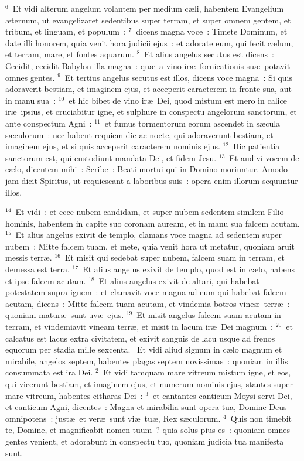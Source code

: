 ${}^{6}$~Et vidi alterum angelum volantem per medium c\ae li, habentem Evangelium \ae ternum, ut evangelizaret sedentibus super terram, et super omnem gentem, et tribum, et linguam, et populum~:
${}^{7}$~dicens magna voce~: Timete Dominum, et date illi honorem, quia venit hora judicii ejus~: et adorate eum, qui fecit c\ae lum, et terram, mare, et fontes aquarum.
${}^{8}$~Et alius angelus secutus est dicens~: Cecidit, cecidit Babylon illa magna~: qu\ae\ a vino ir\ae\ fornicationis su\ae\ potavit omnes gentes.
${}^{9}$~Et tertius angelus secutus est illos, dicens voce magna~: Si quis adoraverit bestiam, et imaginem ejus, et acceperit caracterem in fronte sua, aut in manu sua~:
${}^{10}$~et hic bibet de vino ir\ae\ Dei, quod mistum est mero in calice ir\ae\ ipsius, et cruciabitur igne, et sulphure in conspectu angelorum sanctorum, et ante conspectum Agni~:
${}^{11}$~et fumus tormentorum eorum ascendet in s\ae cula s\ae culorum~: nec habent requiem die ac nocte, qui adoraverunt bestiam, et imaginem ejus, et si quis acceperit caracterem nominis ejus.
${}^{12}$~Hic patientia sanctorum est, qui custodiunt mandata Dei, et fidem Jesu.
${}^{13}$~Et audivi vocem de c\ae lo, dicentem mihi~: Scribe~: Beati mortui qui in Domino moriuntur. Amodo jam dicit Spiritus, ut requiescant a laboribus suis~: opera enim illorum sequuntur illos.


${}^{14}$~Et vidi~: et ecce nubem candidam, et super nubem sedentem similem Filio hominis, habentem in capite suo coronam auream, et in manu sua falcem acutam.
${}^{15}$~Et alius angelus exivit de templo, clamans voce magna ad sedentem super nubem~: Mitte falcem tuam, et mete, quia venit hora ut metatur, quoniam aruit messis terr\ae .
${}^{16}$~Et misit qui sedebat super nubem, falcem suam in terram, et demessa est terra.
${}^{17}$~Et alius angelus exivit de templo, quod est in c\ae lo, habens et ipse falcem acutam.
${}^{18}$~Et alius angelus exivit de altari, qui habebat potestatem supra ignem~: et clamavit voce magna ad eum qui habebat falcem acutam, dicens~: Mitte falcem tuam acutam, et vindemia botros vine\ae\ terr\ae~: quoniam matur\ae\ sunt uv\ae\ ejus.
${}^{19}$~Et misit angelus falcem suam acutam in terram, et vindemiavit vineam terr\ae , et misit in lacum ir\ae\ Dei magnum~:
${}^{20}$~et calcatus est lacus extra civitatem, et exivit sanguis de lacu usque ad frenos equorum per stadia mille sexcenta.
~\lettrine[lines=10,image=true,loversize=0.05,lraise=-0.03]{E}{}t vidi aliud signum in c\ae lo magnum et mirabile, angelos septem, habentes plagas septem novissimas~: quoniam in illis consummata est ira Dei.
${}^{2}$~Et vidi tamquam mare vitreum mistum igne, et eos, qui vicerunt bestiam, et imaginem ejus, et numerum nominis ejus, stantes super mare vitreum, habentes citharas Dei~:
${}^{3}$~et cantantes canticum Moysi servi Dei, et canticum Agni, dicentes~: Magna et mirabilia sunt opera tua, Domine Deus omnipotens~: just\ae\ et ver\ae\ sunt vi\ae\ tu\ae , Rex s\ae culorum.
${}^{4}$~Quis non timebit te, Domine, et magnificabit nomen tuum~? quia solus pius es~: quoniam omnes gentes venient, et adorabunt in conspectu tuo, quoniam judicia tua manifesta sunt.


